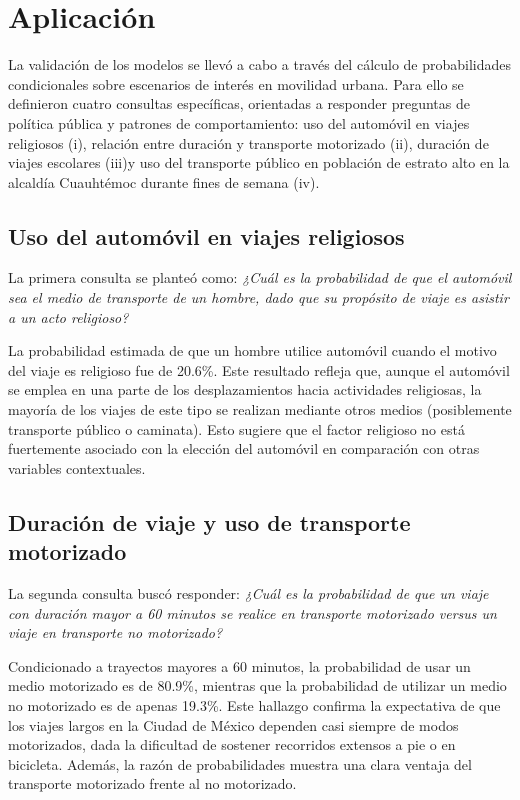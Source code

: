 \documentclass[eng]{ajceam-class}
\begin{document}
\section{Aplicación}

La validación de los modelos se llevó a cabo a través del cálculo de probabilidades condicionales sobre escenarios de interés en movilidad urbana. Para ello se definieron cuatro consultas específicas, orientadas a responder preguntas de política pública y patrones de comportamiento: uso del automóvil en viajes religiosos (i), relación entre duración y transporte motorizado (ii), duración de viajes escolares (iii)y uso del transporte público en población de estrato alto en la alcaldía Cuauhtémoc durante fines de semana (iv).

\subsection{Uso del automóvil en viajes religiosos}

La primera consulta se planteó como: \textit{¿Cuál es la probabilidad de que el automóvil sea el medio de transporte de un hombre, dado que su propósito de viaje es asistir a un acto religioso?}

La probabilidad estimada de que un hombre utilice automóvil cuando el motivo del viaje es religioso fue de 20.6\%. Este resultado refleja que, aunque el automóvil se emplea en una parte de los desplazamientos hacia actividades religiosas, la mayoría de los viajes de este tipo se realizan mediante otros medios (posiblemente transporte público o caminata). Esto sugiere que el factor religioso no está fuertemente asociado con la elección del automóvil en comparación con otras variables contextuales.

\subsection{Duración de viaje y uso de transporte motorizado}

La segunda consulta buscó responder: \textit{¿Cuál es la probabilidad de que un viaje con duración mayor a 60 minutos se realice en transporte motorizado versus un viaje en transporte no motorizado?}

Condicionado a trayectos mayores a 60 minutos, la probabilidad de usar un medio motorizado es de 80.9\%, mientras que la probabilidad de utilizar un medio no motorizado es de apenas 19.3\%. Este hallazgo confirma la expectativa de que los viajes largos en la Ciudad de México dependen casi siempre de modos motorizados, dada la dificultad de sostener recorridos extensos a pie o en bicicleta. Además, la razón de probabilidades muestra una clara ventaja del transporte motorizado frente al no motorizado.
\end{document}
